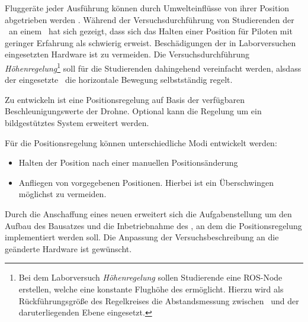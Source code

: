
Fluggeräte jeder Ausführung können durch Umwelteinflüsse von ihrer Position abgetrieben werden . Während der Versuchsdurchführung von Studierenden der \DHBW\ an einem \Quad\ hat sich gezeigt, dass sich das Halten einer Position für Piloten mit geringer Erfahrung als schwierig erweist. Beschädigungen der in Laborversuchen eingesetzten Hardware ist zu vermeiden.
Die Versuchsdurchführung \textit{Höhenregelung}\footnote{Bei dem Laborversuch \textit{Höhenregelung} sollen Studierende eine ROS-Node erstellen, welche eine konstante Flughöhe des \Quad[s] ermöglicht. Hierzu wird als Rückführungsgröße des Regelkreises die Abstandsmessung zwischen \Quad\ und der daruterliegenden Ebene eingesetzt.} soll für die Studierenden dahingehend vereinfacht werden, alsdass der eingesetzte \Quad\ die horizontale Bewegung selbstständig regelt.

Zu entwickeln ist eine Positionsregelung auf Basis der verfügbaren Beschleunigungswerte der Drohne. Optional kann die Regelung um ein bildgestütztes System erweitert werden.

Für die Positionsregelung können unterschiedliche Modi entwickelt werden:
\begin{itemize}
\item Halten der Position nach einer manuellen Positionsänderung
\item Anfliegen von vorgegebenen Positionen. Hierbei ist ein Überschwingen möglichst zu vermeiden.
\end{itemize}

Durch die Anschaffung eines neuen \Quad[s] erweitert sich die Aufgabenstellung um den Aufbau des Bausatzes und die Inbetriebnahme des \Quad[s], an dem die Positionsregelung implementiert werden soll.
Die Anpassung der Versuchsbeschreibung an die geänderte Hardware ist gewünscht.







